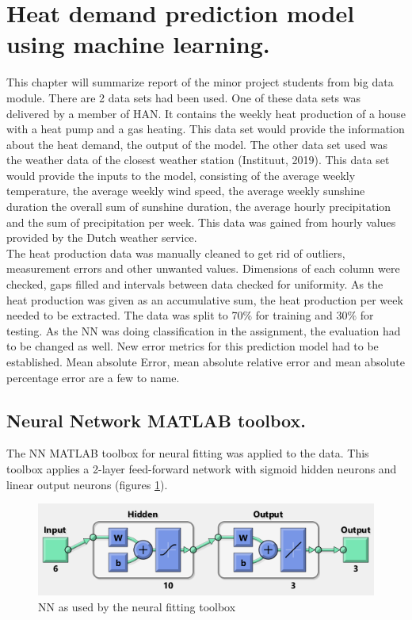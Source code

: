 \section{Heat demand prediction model using machine learning.}

This chapter will summarize report of the minor project students from big data module.
There are 2 data sets had been used. One of these data sets was delivered by a member of HAN. It contains the weekly heat production of a house with a heat pump and a gas heating. This data set would provide the information about the heat demand, the output of the model. The other data set used was the weather data of the closest weather station (Instituut, 2019). This data set would provide the inputs to the model, consisting of the average weekly temperature, the average weekly wind speed, the average weekly sunshine duration the overall sum of sunshine duration, the average hourly precipitation and the sum of precipitation per week. This data was gained from hourly values provided by the Dutch weather service.\\
The heat production data was manually cleaned to get rid of outliers, measurement errors and other unwanted values. Dimensions of each column were checked, gaps filled and intervals between data checked for uniformity. As the heat production was given as an accumulative sum, the heat production per week needed to be extracted.
The data was split to 70${\%}$ for training and 30${\%}$ for testing.
As the NN was doing classification in the assignment, the evaluation had to be changed as well. New error metrics for this prediction model had to be established. Mean absolute Error, mean absolute relative error and mean absolute percentage error are a few to name.

\subsection{Neural Network MATLAB toolbox.}

The NN MATLAB toolbox for neural fitting was applied to the data. This toolbox applies a 2-layer feed-forward network with sigmoid hidden neurons and linear output neurons (figures \ref{fig:NNMatlb}). 

\begin{figure}[H]
	\centering
	\includegraphics[width=1.0\columnwidth]{Pictures/NN matlab.png}
	\caption[Short title]{NN as used by the neural fitting toolbox}
	\label{fig:NNMatlb}
	\end{figure}

